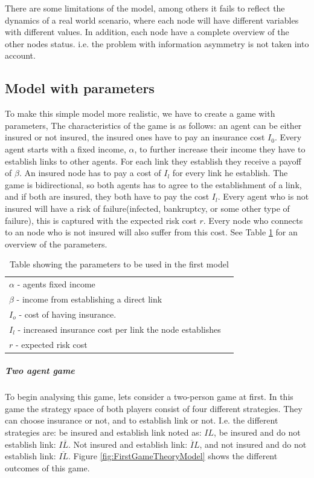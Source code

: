 There are some limitations of the model, among others it fails to reflect the dynamics of a real world scenario, where each node will have different variables with different values. In addition, each node have a complete overview of the other nodes status. i.e. the problem with information asymmetry is not taken into account. 

\subsection{Model with parameters}
To make this simple model more realistic, we have to create a game with parameters, The characteristics of the game is as follows: an agent can be either insured or not insured, the insured ones have to pay an insurance cost $I_{0}$. Every agent starts with a fixed income, $\alpha$, to further increase their income they have to establish links to other agents. For each link they establish they receive a payoff of $\beta$. An insured node has to pay a cost of $I_{l}$ for every link he establish. The game is bidirectional, so both agents has to agree to the establishment of a link, and if both are insured, they both have to pay the cost $I_{l}$. 
Every agent who is not insured will have a risk of failure(infected, bankruptcy, or some other type of failure), this is captured with the expected risk cost $r$. Every node who connects to an node who is not insured will also suffer from this cost. See Table \ref{tbl:simplegamepara} for an overview of the parameters. 
\begin{table}[h]
\centering
\begin{tabular}{lc}
 \hline
  $\alpha$ - agents fixed income\\
  $\beta$ - income from establishing a direct link \\
  $I_{o}$ - cost of having insurance. \\
  $I_{l}$ - increased insurance cost per link the node establishes\\
  $r$ - expected risk cost\\
  \hline
\end{tabular}
\caption{Table showing the parameters to be used in the first model \label{tbl:simplegamepara}}
\end{table}
\subparagraph{Two agent game}
To begin analysing this game, lets consider a two-person game at first. In this game the strategy space of both players consist of four different strategies. They can choose insurance or not, and to establish link or not. I.e. the different strategies are: be insured and establish link noted as: $IL$, 
be insured and do not establish link: $I\overline{L}$. Not insured and establish link: $\overline{I}L$, and not insured and do not establish link: $\overline{IL}$.
Figure \ref{fig:FirstGameTheoryModel} shows the different outcomes of this game.

